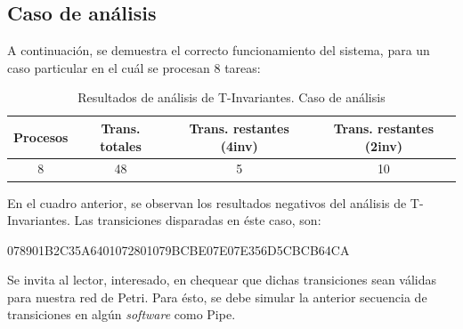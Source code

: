 \documentclass{article}
\begin{document}
    \subsection{Caso de análisis} \noindent
    A continuación, se demuestra el correcto funcionamiento del sistema, para un caso particular
    en el cuál se procesan 8 tareas:
    \begin{center}
        \begin{table}[H]
            \centering
            \begin{tabular}{||c|c|c|c||} 
                \hline
                Procesos & Trans. totales & Trans. restantes (4inv) & Trans. restantes (2inv) \\ [0.5ex] 
                \hline\hline
                8 & 48 & 5 & 10 \\ 
                \hline
            \end{tabular}
            \caption{Resultados de análisis de T-Invariantes. Caso de análisis}
        \end{table}
    \end{center} \par
    En el cuadro anterior, se observan los resultados negativos del análisis de 
    T-Invariantes. Las transiciones disparadas en éste caso, son: \newline 
    \begin{center}
        078901B2C35A6401072801079BCBE07E07E356D5CBCB64CA 
    \end{center} \par
    Se invita al lector, interesado, en chequear que dichas transiciones sean válidas para 
    nuestra red de Petri. Para ésto, se debe simular la anterior secuencia de transiciones
    en algún \emph{software} como Pipe.
\end{document}
